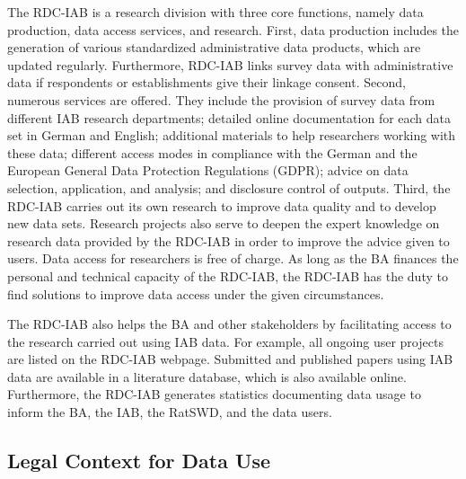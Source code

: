 The RDC-IAB is a research division with three core functions, namely data production, data access services, and research. First, data production includes the generation of various standardized administrative data products, which are updated regularly. Furthermore, RDC-IAB links survey data with administrative data if respondents or establishments give their linkage consent. Second, numerous services are offered. They include the provision of survey data from different IAB research departments; detailed online documentation for each data set in German and English; additional materials to help researchers working with these data; different access modes in compliance with the German and the European General Data Protection Regulations (GDPR); advice on data selection, application, and analysis; and disclosure control of outputs. Third, the RDC-IAB carries out its own research to improve data quality and to develop new data sets. Research projects also serve to deepen the expert knowledge on research data provided by the RDC-IAB in order to improve the advice given to users. Data access for researchers is free of charge. As long as the BA finances the personal and technical capacity of the RDC-IAB, the RDC-IAB has the duty to find solutions to improve data access under the given circumstances.

The RDC-IAB also helps the BA and other stakeholders by facilitating access to the research carried out using IAB data. For example, all ongoing user projects are listed on the RDC-IAB webpage. Submitted and published papers using IAB data are available in a literature database, which is also available online. Furthermore, the RDC-IAB generates statistics documenting data usage to inform the BA, the IAB, the RatSWD, and the data users.

\hypertarget{legal-context-for-data-use}{%
\subsection{Legal Context for Data Use}\label{legal-context-for-data-use}}

